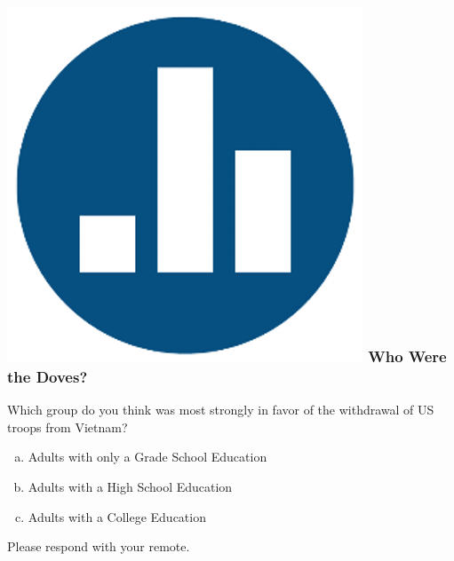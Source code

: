 \documentclass[handout]{beamer}
\begin{document}
\begin{frame}
\frametitle{\includegraphics[scale = 0.05]{./images/clicker} \hfill Who Were the Doves?}
Which group do you think was most strongly \alert{in favor of} the withdrawal of US troops from Vietnam?
\begin{enumerate}[(a)]
	\item Adults with only a Grade School Education
	\item Adults with a High School Education
	\item Adults with a College Education
\end{enumerate}
\vspace{2em}
Please respond with your remote.

\end{frame}
\end{document}
